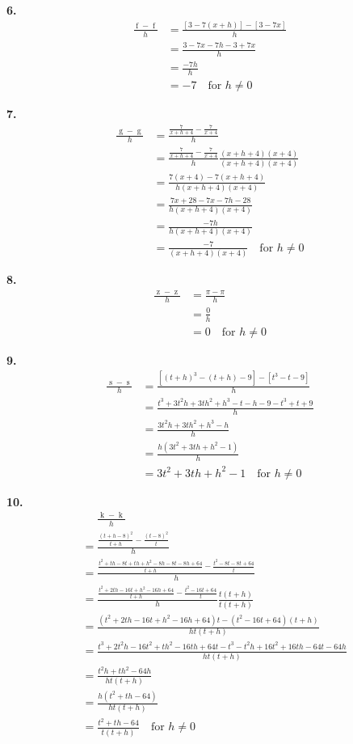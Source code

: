 \documentclass[12pt,]{book}
\theoremstyle{plain}
\theoremstyle{definition}
\numberwithin{equation}{section}
\newcommand{\fe}[2]{\mathop{{#1}{\left(#2\right)}}}
\begin{document}
\par\smallskip
\noindent\textbf{6.}\quad{}\begin{align*}
\frac{\fe{f}{x+h}-\fe{f}{x}}{h}&=\frac{\left[3-7(x+h)\right]-\left[3-7x\right]}{h}\\
&=\frac{3-7x-7h-3+7x}{h}\\
&=\frac{-7h}{h}\\
&=-7\quad\text{for $h\neq0$}
\end{align*}%
\par\smallskip
\noindent\textbf{7.}\quad{}\begin{align*}
\frac{\fe{g}{x+h}-\fe{g}{x}}{h}&=\frac{\frac{7}{x+h+4}-\frac{7}{x+4}}{h}\\
&=\frac{\frac{7}{x+h+4}-\frac{7}{x+4}}{h}\frac{(x+h+4)(x+4)}{(x+h+4)(x+4)}\\
&=\frac{7(x+4)-7(x+h+4)}{h(x+h+4)(x+4)}\\
&=\frac{7x+28-7x-7h-28}{h(x+h+4)(x+4)}\\
&=\frac{-7h}{h(x+h+4)(x+4)}\\
&=\frac{-7}{(x+h+4)(x+4)}\quad\text{for $h\neq0$}
\end{align*}%
\par\smallskip
\noindent\textbf{8.}\quad{}\begin{align*}
\frac{\fe{z}{x+h}-\fe{z}{x}}{h}&=\frac{\pi-\pi}{h}\\
&=\frac{0}{h}\\
&=0\quad\text{for $h\neq0$}
\end{align*}%
\par\smallskip
\noindent\textbf{9.}\quad{}\begin{align*}
\frac{\fe{s}{t+h}-\fe{s}{t}}{h}&=\frac{\left[(t+h)^3-(t+h)-9\right]-\left[t^3-t-9\right]}{h}\\
&=\frac{t^3+3t^2h+3th^2+h^3-t-h-9-t^3+t+9}{h}\\
&=\frac{3t^2h+3th^2+h^3-h}{h}\\
&=\frac{h(3t^2+3th+h^2-1)}{h}\\
&=3t^2+3th+h^2-1\quad\text{for $h\neq0$}
\end{align*}%
\par\smallskip
\noindent\textbf{10.}\quad{}\begin{align*}
&\phantom{={}}\frac{\fe{k}{t+h}-\fe{k}{t}}{h}\\
&=\frac{\frac{(t+h-8)^2}{t+h}-\frac{(t-8)^2}{t}}{h}\\
&=\frac{\frac{t^2+th-8t+th+h^2-8h-8t-8h+64}{t+h}-\frac{t^2-8t-8t+64}{t}}{h}\\
&=\frac{\frac{t^2+2th-16t+h^2-16h+64}{t+h}-\frac{t^2-16t+64}{t}}{h}\frac{t(t+h)}{t(t+h)}\\
&=\frac{(t^2+2th-16t+h^2-16h+64)t-(t^2-16t+64)(t+h)}{ht(t+h)}\\
&=\frac{t^3+2t^2h-16t^2+th^2-16th+64t-t^3-t^2h+16t^2+16th-64t-64h}{ht(t+h)}\\
&=\frac{t^2h+th^2-64h}{ht(t+h)}\\
&=\frac{h(t^2+th-64)}{ht(t+h)}\\
&=\frac{t^2+th-64}{t(t+h)}\quad\text{for $h\neq0$}
\end{align*}%
\end{document}
